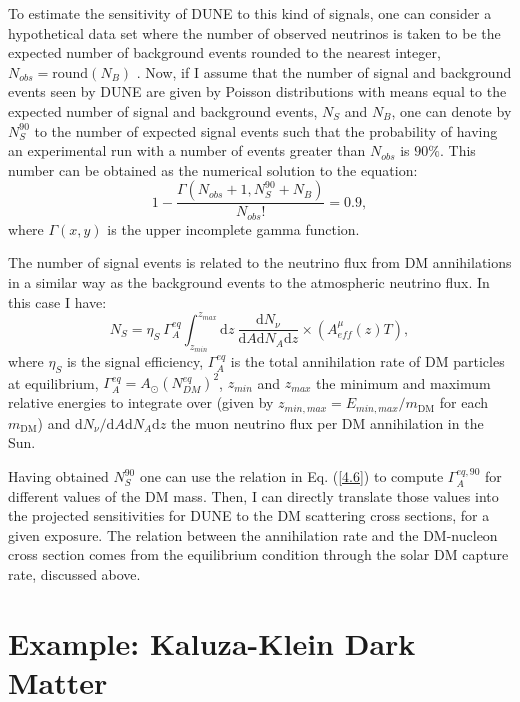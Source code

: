 To estimate the sensitivity of DUNE to this kind of signals, one can consider a hypothetical data set where the number of observed neutrinos is taken to be the expected number of background events rounded to the nearest integer, $N_{obs} = \mathrm{round}(N_{B})$ \cite{Cowan2010}. Now, if I assume that the number of signal and background events seen by DUNE are given by Poisson distributions with means equal to the expected number of signal and background events, $N_{S}$ and $N_{B}$, one can denote by $N_{S}^{90}$ to the number of expected signal events such that the probability of having an experimental run with a number of events greater than $N_{obs}$ is $90\%$. This number can be obtained as the numerical solution to the equation:
\begin{equation}\label{4.5}
	1 - \frac{\Gamma\left(N_{obs}+1, N_{S}^{90}+N_{B}\right)}{N_{obs}!} = 0.9,
\end{equation}
where $\Gamma(x,y)$ is the upper incomplete gamma function.

The number of signal events is related to the neutrino flux from DM annihilations in a similar way as the background events to the atmospheric neutrino flux. In this case I have:
\begin{equation}\label{4.6}
	N_{S} = \eta_{S} \ \Gamma_{A}^{eq} \int_{z_{min}}^{z_{max}} \mathrm{d}z \ \frac{\mathrm{d}N_{\nu}}{\mathrm{d}A \mathrm{d}N_{A} \mathrm{d}z}  \times \left(A_{eff}^{\mu}(z) T\right),
\end{equation}
where $\eta_{S}$ is the signal efficiency, $\Gamma_{A}^{eq}$ is the total annihilation rate of DM particles at equilibrium, $\Gamma_{A}^{eq} = A_{\odot} \left(N_{DM}^{eq}\right)^{2}$, $z_{min}$ and $z_{max}$ the minimum and maximum relative energies to integrate over (given by $z_{min, max} = E_{min, max}/m_{\mathrm{DM}}$ for each $m_{\mathrm{DM}}$) and $\mathrm{d}N_{\nu}/\mathrm{d}A \mathrm{d}N_{A} \mathrm{d}z$ the muon neutrino flux per DM annihilation in the Sun.

Having obtained $N_{S}^{90}$ one can use the relation in Eq. (\ref{4.6}) to compute $\Gamma_{A}^{eq,90}$ for different values of the DM mass. Then, I can directly translate those values into the projected sensitivities for DUNE to the DM scattering cross sections, for a given exposure. The relation between the annihilation rate and the DM-nucleon cross section comes from the equilibrium condition through the solar DM capture rate, discussed above.

\section{Example: Kaluza-Klein Dark Matter}
\label{sec:dm_analysis_kk_dm}


